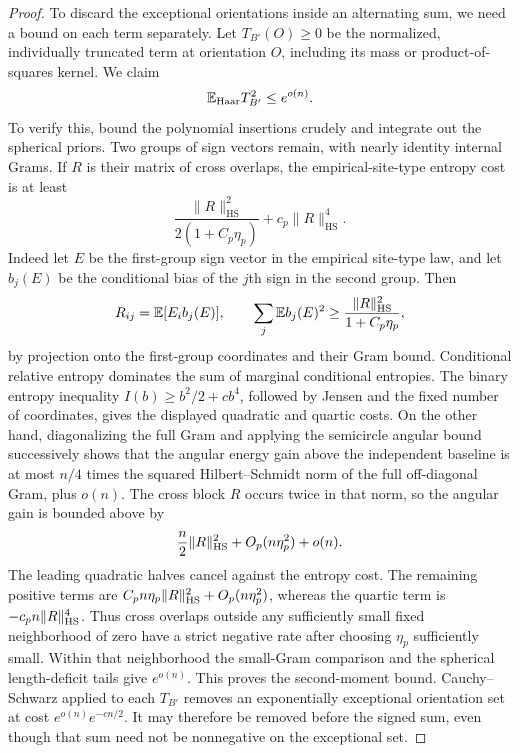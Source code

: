 \begin{proof}
To discard the exceptional orientations inside an alternating sum,
we need a bound on each term separately. Let \(T_{B'}(O)\ge0\)
be the normalized, individually truncated term at orientation \(O\),
including its mass or product-of-squares kernel. We claim
\[
 \mathbb E_{\rm Haar}T_{B'}^2\le e^{o(n)}.
\]
To verify this, bound the polynomial insertions crudely
and integrate out the spherical priors.  Two groups of sign vectors
remain, with nearly identity internal Grams.  If \(R\) is their matrix
of cross overlaps, the empirical-site-type entropy cost is at least
\[
 \frac{\|R\|_{\mathrm{HS}}^2}{2(1+C_p\eta_p)}
                      +c_p\|R\|_{\mathrm{HS}}^4.
\]
Indeed let \(E\) be the first-group sign vector in the empirical
site-type law, and let \(b_j(E)\) be the conditional bias of the
\(j\)th sign in the second group. Then
\[
 R_{ij}=\mathbb E[E_i b_j(E)],\qquad
 \sum_j\mathbb E b_j(E)^2
       \ge \frac{\|R\|_{\rm HS}^2}{1+C_p\eta_p},
\]
by projection onto the first-group coordinates and their Gram bound.
Conditional relative entropy dominates the sum of marginal
conditional entropies. The binary entropy inequality
\(I(b)\ge b^2/2+c b^4\), followed by Jensen and the fixed number
of coordinates, gives the displayed quadratic and quartic costs.
On the other hand, diagonalizing the
full Gram and applying the semicircle angular bound successively shows
that the angular energy gain above the independent baseline is at most
\(n/4\) times the squared Hilbert--Schmidt norm of the full off-diagonal
Gram, plus \(o(n)\). The cross block \(R\) occurs twice in that
norm, so the angular gain is bounded above by
\[
 \frac n2\|R\|_{\rm HS}^2+O_p(n\eta_p^2)+o(n).
\]
The leading quadratic halves cancel against the entropy cost.
The remaining positive terms are
\(C_p n\eta_p\|R\|_{\rm HS}^2+O_p(n\eta_p^2)\), whereas the
quartic term is \(-c_p n\|R\|_{\rm HS}^4\). Thus cross overlaps outside any sufficiently small
fixed neighborhood of zero have a strict negative rate after choosing
\(\eta_p\) sufficiently small.  Within that neighborhood the small-Gram
comparison and the spherical length-deficit tails give \(e^{o(n)}\).
This proves the second-moment bound. Cauchy--Schwarz applied to
each \(T_{B'}\) removes an exponentially exceptional orientation
set at cost \(e^{o(n)}e^{-cn/2}\). It may therefore be removed
before the signed sum, even though that sum need not be nonnegative
on the exceptional set.


\end{proof}
